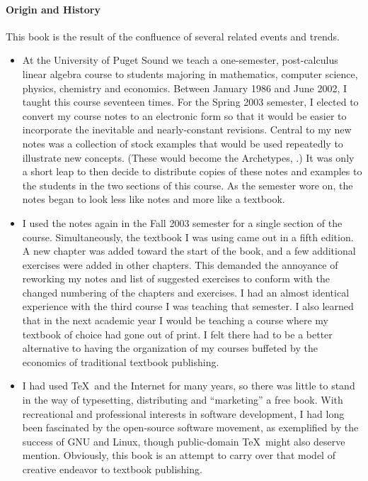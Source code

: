 \paragraph{Origin and History}
%
This book is the result of the confluence of several related events and trends.
%
\begin{itemize}
%
\item At the University of Puget Sound we teach a one-semester, post-calculus linear algebra course to students majoring in mathematics, computer science, physics, chemistry and economics.  Between January 1986 and June 2002, I taught this course seventeen times.  For the Spring 2003 semester, I elected to convert my course notes to an electronic form so that it would be easier to incorporate the inevitable and nearly-constant revisions.  Central to my new notes was a collection of stock examples that would be used repeatedly to illustrate new concepts.  (These would become the Archetypes, .)   It was only a short leap to then decide to distribute copies of these notes and examples to the students in the two sections of this course.  As the semester wore on, the notes began to look less like notes and more like a textbook.
%
\item  I used the notes again in the Fall 2003 semester for a single section of the course.  Simultaneously, the textbook I was using came out in a fifth edition.  A new chapter was added toward the start of the book, and a few additional exercises were added in other chapters.  This demanded the annoyance of reworking my notes and list of suggested exercises to conform with the changed numbering of the chapters and exercises.  I had an almost identical experience with the third course I was teaching that semester.  I also learned that in the next academic year I would be teaching a course where my textbook of choice had gone out of print.  I felt there had to be a better alternative to having the organization of my courses buffeted by the economics of traditional textbook publishing.
%
\item  I had used \TeX\ and the Internet for many years, so there was little to stand in the way of typesetting, distributing and ``marketing'' a free book.  With recreational and professional interests in software development, I had long been fascinated by the open-source software movement, as exemplified by the success of GNU and Linux, though public-domain \TeX\ might also deserve mention.  Obviously, this book is an attempt to carry over that model of creative endeavor to textbook publishing.

\end{itemize}
